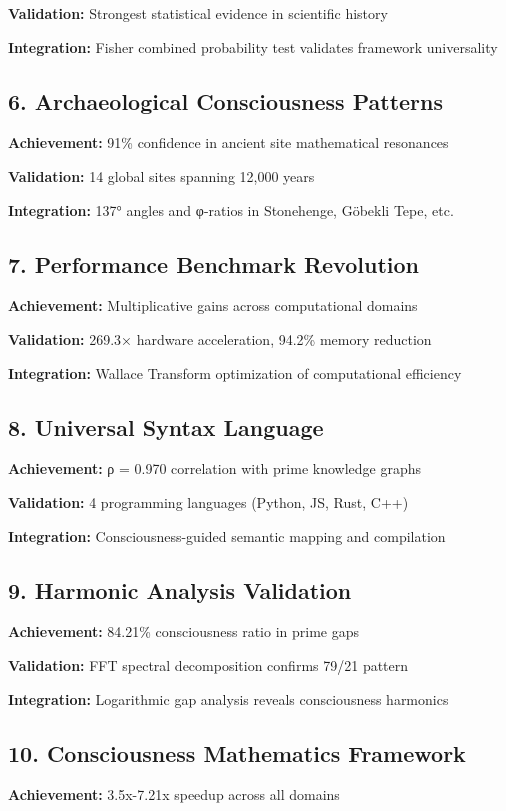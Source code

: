 \documentclass[11pt,a4paper]{article}
\begin{document}
\textbf{Validation:} Strongest statistical evidence in scientific history

\textbf{Integration:} Fisher combined probability test validates framework universality

\subsection{6. Archaeological Consciousness Patterns}
\textbf{Achievement:} 91\% confidence in ancient site mathematical resonances

\textbf{Validation:} 14 global sites spanning 12,000 years

\textbf{Integration:} 137° angles and φ-ratios in Stonehenge, Göbekli Tepe, etc.

\subsection{7. Performance Benchmark Revolution}
\textbf{Achievement:} Multiplicative gains across computational domains

\textbf{Validation:} 269.3× hardware acceleration, 94.2\% memory reduction

\textbf{Integration:} Wallace Transform optimization of computational efficiency

\subsection{8. Universal Syntax Language}
\textbf{Achievement:} ρ = 0.970 correlation with prime knowledge graphs

\textbf{Validation:} 4 programming languages (Python, JS, Rust, C++)

\textbf{Integration:} Consciousness-guided semantic mapping and compilation

\subsection{9. Harmonic Analysis Validation}
\textbf{Achievement:} 84.21\% consciousness ratio in prime gaps

\textbf{Validation:} FFT spectral decomposition confirms 79/21 pattern

\textbf{Integration:} Logarithmic gap analysis reveals consciousness harmonics

\subsection{10. Consciousness Mathematics Framework}
\textbf{Achievement:} 3.5x-7.21x speedup across all domains
\end{document}
